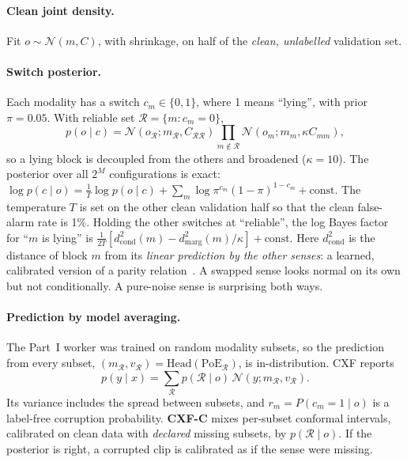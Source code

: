 \documentclass[10pt,twocolumn]{article}
\newcommand{\R}{\mathcal{R}}
\begin{document}
\paragraph{Clean joint density.} Fit $o\sim\mathcal N(m,C)$, with shrinkage, on half of the \emph{clean, unlabelled}
validation set.

\paragraph{Switch posterior.} Each modality has a switch $c_m\in\{0,1\}$, where 1 means ``lying'', with prior
$\pi=0.05$. With reliable set $\R=\{m:c_m=0\}$,
\begin{equation}
p(o\mid c)=\mathcal N(o_\R;m_\R,C_{\R\R})\prod_{m\notin\R}\mathcal N(o_m;m_m,\kappa C_{mm}),
\end{equation}
so a lying block is decoupled from the others and broadened ($\kappa=10$). The posterior over all $2^M$ configurations
is exact:
$\log p(c\mid o)=\tfrac1T\log p(o\mid c)+\sum_m\log\pi^{c_m}(1-\pi)^{1-c_m}+\text{const}$. The temperature $T$ is set on the
other clean validation half so that the clean false-alarm rate is 1\%. Holding the other switches at ``reliable'', the
log Bayes factor for ``$m$ is lying'' is $\tfrac1{2T}[d^2_{\text{cond}}(m)-d^2_{\text{marg}}(m)/\kappa]+\text{const}$.
Here $d^2_{\text{cond}}$ is the distance of block $m$ from its \emph{linear prediction by the other senses}: a learned,
calibrated version of a parity relation~\cite{chow1980failure}. A swapped sense looks normal on its own but not
conditionally. A pure-noise sense is surprising both ways.

\paragraph{Prediction by model averaging.} The Part~I worker was trained on random modality subsets, so the
prediction from every subset, $(m_\R,v_\R)=\mathrm{Head}(\mathrm{PoE}_\R)$, is in-distribution. CXF reports
\begin{equation}
p(y\mid x)=\sum_\R p(\R\mid o)\,\mathcal N(y;m_\R,v_\R).
\end{equation}
Its variance includes the spread between subsets, and $r_m=P(c_m=1\mid o)$ is a label-free corruption probability.
\textbf{CXF-C} mixes per-subset conformal intervals, calibrated on clean data with \emph{declared} missing subsets, by
$p(\R\mid o)$. If the posterior is right, a corrupted clip is calibrated as if the sense were missing.
\end{document}
